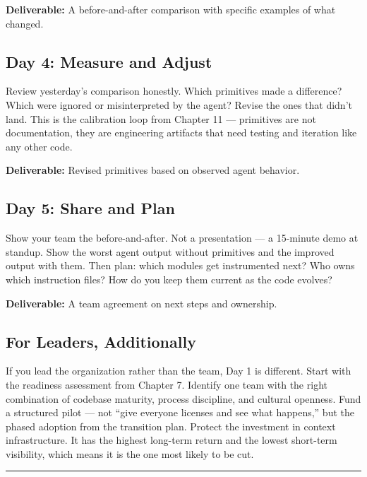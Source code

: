 \documentclass[
  a4paper,
  DIV=11,
  numbers=noendperiod]{scrreprt}
\begin{document}
\textbf{Deliverable:} A before-and-after comparison with specific
examples of what changed.

\subsection{Day 4: Measure and Adjust}\label{day-4-measure-and-adjust}

Review yesterday's comparison honestly. Which primitives made a
difference? Which were ignored or misinterpreted by the agent? Revise
the ones that didn't land. This is the calibration loop from Chapter 11
--- primitives are not documentation, they are engineering artifacts
that need testing and iteration like any other code.

\textbf{Deliverable:} Revised primitives based on observed agent
behavior.

\subsection{Day 5: Share and Plan}\label{day-5-share-and-plan}

Show your team the before-and-after. Not a presentation --- a 15-minute
demo at standup. Show the worst agent output without primitives and the
improved output with them. Then plan: which modules get instrumented
next? Who owns which instruction files? How do you keep them current as
the code evolves?

\textbf{Deliverable:} A team agreement on next steps and ownership.

\subsection{For Leaders, Additionally}\label{for-leaders-additionally}

If you lead the organization rather than the team, Day 1 is different.
Start with the readiness assessment from Chapter 7. Identify one team
with the right combination of codebase maturity, process discipline, and
cultural openness. Fund a structured pilot --- not ``give everyone
licenses and see what happens,'' but the phased adoption from the
transition plan. Protect the investment in context infrastructure. It
has the highest long-term return and the lowest short-term visibility,
which means it is the one most likely to be cut.

\begin{center}\rule{0.5\linewidth}{0.5pt}\end{center}
\end{document}
